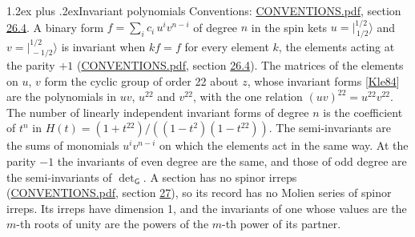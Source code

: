 \documentclass[10pt,a4paper]{article}
\makeatletter
\renewcommand\section{\@startsection{section}{1}{\z@}{-3ex plus -1ex minus -.2ex}%
  {1.2ex plus .2ex}{\normalfont\large\sffamily\bfseries\color{parttitle}}}
\numberwithin{equation}{section}
\newcommand{\grp}[1]{\mathsf{#1}}
\newcommand{\jm}[2]{\bigl\lvert{}^{#1}_{\,#2}\bigr\rangle}
\makeatother
\begin{document}
\section{Invariant polynomials}\label{s:invariants}
Conventions: \href{../../CONVENTIONS.pdf}{CONVENTIONS.pdf}, section \href{../../CONVENTIONS.pdf\#conv.26.4}{26.4}.
\leavevmode\label{n:local.spinor.uv}\label{n:local.binary.form}A binary form $f = \sum_i c_i\, u^i v^{n-i}$ of degree $n$ in the spin kets $u = \jm{1/2}{1/2}$ and $v = \jm{1/2}{-1/2}$ is invariant when $k f = f$ for every element $k$, the elements acting at the parity $+1$ (\href{../../CONVENTIONS.pdf}{CONVENTIONS.pdf}, section \href{../../CONVENTIONS.pdf\#conv.26.4}{26.4}).
The matrices of the elements on $u$, $v$ form the cyclic group of order 22 about $z$, whose invariant forms [\href{../../../REFERENCES.pdf\#ref.Kle84}{Kle84}] are the polynomials in $uv$, $u^{22}$ and $v^{22}$, with the one relation $(uv)^{22} = u^{22}v^{22}$. \label{n:function.hilbert}The number of linearly independent invariant forms of degree $n$ is the coefficient of $t^n$ in $H(t) = (1 + t^{22})/((1-t^{2})(1-t^{22}))$. The semi-invariants are the sums of monomials $u^i v^{n-i}$ on which the elements act in the same way. At the parity $-1$ the invariants of even degree are the same, and those of odd degree are the semi-invariants of $\det_{\grp{G}}$. A section has no spinor irreps (\href{../../CONVENTIONS.pdf}{CONVENTIONS.pdf}, section \href{../../CONVENTIONS.pdf\#conv.27}{27}), so its record has no Molien series of spinor irreps. Its irreps have dimension 1, and the invariants of one whose values are the $m$-th roots of unity are the powers of the $m$-th power of its partner.
\end{document}
